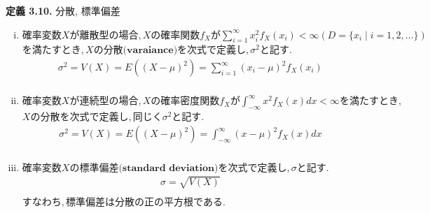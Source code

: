 \documentclass[dvipdfmx,10pt, a4j]{jarticle}
\theoremstyle{definition}
\begin{document}
\noindent
\textbf{定義 3.10.} 分散, 標準偏差\\
\begin{enumerate}[i)]
    \item $確率変数X が離散型の場合, X の確率関数 f_X が \sum_{i=1}^{\infty}{x_i^{2}f_X(x_i)} < \infty (D= \{x_i \mid i=1,2,\dots \})$
          $を満たすとき, Xの \textbf{分散(varaiance)}を次式で定義し, \sigma^{2}と記す.$\\
          \begin{align*}
              \sigma^{2} = V(X) = E((X-\mu)^2) = \sum_{i=1}^{\infty}{(x_i - \mu)^{2}f_X(x_i)} \\
          \end{align*}
    \item $確率変数Xが連続型の場合, X の確率密度関数f_X が \int_{-\infty}^{\infty}{x^2f_X(x)dx} < \infty を満たすとき,$
          $Xの \textbf{分散}を次式で定義し, 同じく \sigma^{2}と記す.$\\
          \begin{align*}
              \sigma^{2} = V(X) = E((X-\mu)^2) = \int_{-\infty}^{\infty}{(x-\mu)^2f_X(x)dx} \\
          \end{align*}
    \item $確率変数X の \textbf{標準偏差(standard deviation)} を次式で定義し, \sigma と記す.$\\
          \begin{align*}
              \sigma = \sqrt{V(X)} \\
          \end{align*}
          $すなわち, 標準偏差は分散の正の平方根である.$\\
\end{enumerate}
\end{document}
